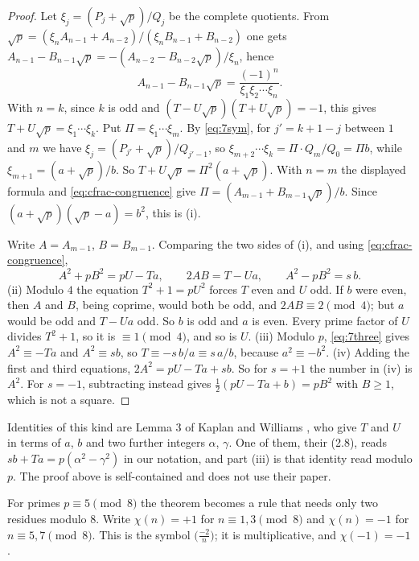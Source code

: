\begin{proof}
Let $\xi_j=(P_j+\sqrt p)/Q_j$ be the complete quotients. From
$\sqrt p=(\xi_nA_{n-1}+A_{n-2})/(\xi_nB_{n-1}+B_{n-2})$ one gets
$A_{n-1}-B_{n-1}\sqrt p=-(A_{n-2}-B_{n-2}\sqrt p)/\xi_n$, hence
\[
  A_{n-1}-B_{n-1}\sqrt p=\frac{(-1)^{n}}{\xi_1\xi_2\cdots\xi_n}.
\]
With $n=k$, since $k$ is odd and $(T-U\sqrt p)(T+U\sqrt p)=-1$, this gives $T+U\sqrt p=\xi_1\cdots\xi_k$. Put $\Pi=\xi_1\cdots\xi_m$. By \eqref{eq:7sym}, for
$j'=k+1-j$ between $1$ and $m$ we have $\xi_j=(P_{j'}+\sqrt p)/Q_{j'-1}$, so
$\xi_{m+2}\cdots\xi_k=\Pi\cdot Q_m/Q_0=\Pi b$, while $\xi_{m+1}=(a+\sqrt p)/b$. So
$T+U\sqrt p=\Pi^{2}(a+\sqrt p)$. With $n=m$ the displayed formula and \eqref{eq:cfrac-congruence} give
$\Pi=(A_{m-1}+B_{m-1}\sqrt p)/b$. Since $(a+\sqrt p)(\sqrt p-a)=b^{2}$, this is (i).

Write $A=A_{m-1}$, $B=B_{m-1}$. Comparing the two sides of (i), and using \eqref{eq:cfrac-congruence},
\begin{equation}\label{eq:7three}
  A^{2}+pB^{2}=pU-Ta,\qquad 2AB=T-Ua,\qquad A^{2}-pB^{2}=s\,b .
\end{equation}
(ii) Modulo $4$ the equation $T^{2}+1=pU^{2}$ forces $T$ even and $U$ odd. If $b$ were even, then $A$
and $B$, being coprime, would both be odd, and $2AB\equiv2\pmod4$; but $a$ would be odd and $T-Ua$ odd.
So $b$ is odd and $a$ is even. Every prime factor of $U$ divides $T^{2}+1$, so it is $\equiv1\pmod4$,
and so is $U$. (iii) Modulo $p$, \eqref{eq:7three} gives $A^{2}\equiv-Ta$ and $A^{2}\equiv sb$, so
$T\equiv-s\,b/a\equiv s\,a/b$, because $a^{2}\equiv-b^{2}$. (iv) Adding the first and third equations,
$2A^{2}=pU-Ta+sb$. So for $s=+1$ the number in (iv) is $A^{2}$. For $s=-1$, subtracting instead gives
$\tfrac12(pU-Ta+b)=pB^{2}$ with $B\ge1$, which is not a square.
\end{proof}

Identities of this kind are Lemma 3 of Kaplan and Williams \citep{KaplanWilliams1986}, who give $T$ and $U$ in terms
of $a$, $b$ and two further integers $\alpha$, $\gamma$. One of them, their (2.8), reads
$sb+Ta=p(\alpha^{2}-\gamma^{2})$ in our notation, and part (iii) is that identity read modulo $p$. The
proof above is self-contained and does not use their paper.

For primes $p\equiv5\pmod8$ the theorem becomes a rule that needs only two residues modulo $8$. Write
$\chi(n)=+1$ for $n\equiv1,3\pmod8$ and $\chi(n)=-1$ for $n\equiv5,7\pmod8$. This is the symbol
$\bigl(\frac{-2}{n}\bigr)$; it is multiplicative, and $\chi(-1)=-1$.

